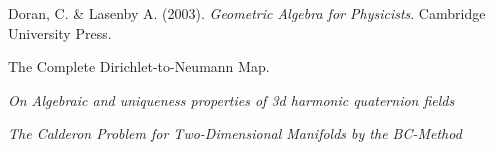 \newpage
\begin{thebibliography}{1}
    
 Doran, C. \& Lasenby A. (2003). \emph{Geometric Algebra for Physicists}. Cambridge University Press.

 The Complete Dirichlet-to-Neumann Map.

 \emph{On Algebraic and uniqueness properties of 3d harmonic quaternion fields}

 \emph{The Calderon Problem for Two-Dimensional Manifolds by the BC-Method}
	
	
\end{thebibliography}


